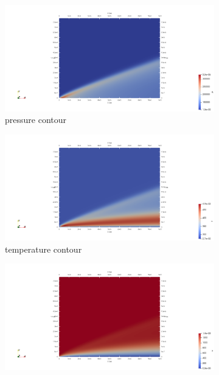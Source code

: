 \documentclass[conf]{new-aiaa}
\begin{document}
\begin{figure}[!htb]
    \hfill
    \begin{subfigure}{0.45\textwidth}
        \includegraphics[width=\textwidth]{supportingFiles/solution_files_flatplate_constant_Twall/pressure.png}
        \caption{pressure contour}
    \end{subfigure}
    \hfill
    \begin{subfigure}{0.45\textwidth}
        \includegraphics[width=\textwidth]{supportingFiles/solution_files_flatplate_constant_Twall/temperature.png}
        \caption{temperature contour}
    \end{subfigure}
    \hfill
    \begin{subfigure}{0.45\textwidth}
        \includegraphics[width=\textwidth]{supportingFiles/solution_files_flatplate_constant_Twall/u_velocity.png}

\end{subfigure}
\end{figure}
\end{document}
